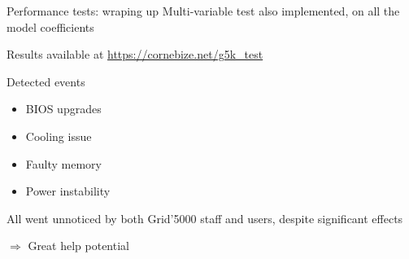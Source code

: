 \documentclass[10pt]{beamer}
\begin{document}
\begin{frame}{Performance tests: wraping up}
    Multi-variable test also implemented, on all the model coefficients
    \pause

    Results available at \alert{\url{https://cornebize.net/g5k\_test}}

    \begin{minipage}{0.55\linewidth}
    \end{minipage} \hfill\pause%
    \begin{minipage}{0.4\linewidth}
        \begin{block}{Detected events}
            \begin{itemize}
                \item BIOS upgrades
                \item Cooling issue
                \item Faulty memory
                \item Power instability
            \end{itemize}
            \pause

            All went unnoticed by both Grid'5000 staff and users, despite significant effects

            \alert{\(\Rightarrow\) Great help potential}
        \end{block}
    \end{minipage}
\end{frame}
\end{document}
